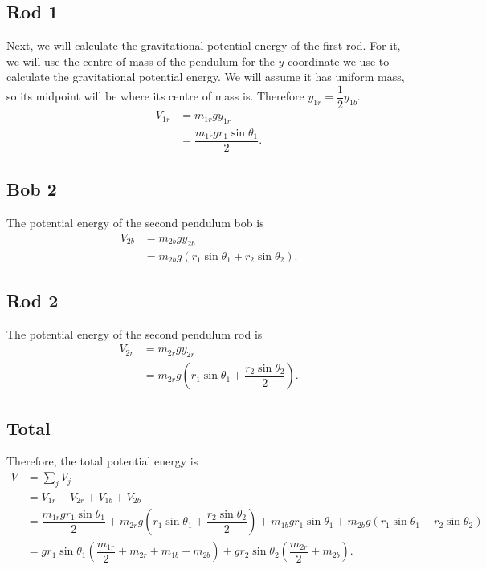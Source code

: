 \documentclass[12pt,a4paper,portrait]{article}
\begin{document}
	\subsection{Rod 1}
	Next, we will calculate the gravitational potential energy of the first rod. For it, we will use the centre of mass of the pendulum for the $y$-coordinate we use to calculate the gravitational potential energy. We will assume it has uniform mass, so its midpoint will be where its centre of mass is. Therefore $y_{1r} = \dfrac{1}{2}y_{1b}$. 
	\begin{align*}
		V_{1r} &= m_{1r} gy_{1r} \\
		&= \dfrac{m_{1r}gr_1 \sin{\theta_1}}{2}.
	\end{align*}
	
	\subsection{Bob 2}
	The potential energy of the second pendulum bob is
	\begin{align*}
		V_{2b} &= m_{2b} gy_{2b} \\
		&= m_{2b} g \left(r_1 \sin{\theta_1} + r_2 \sin{\theta_2}\right).
	\end{align*}
	
	\subsection{Rod 2}
	The potential energy of the second pendulum rod is
	\begin{align*}
		V_{2r} &= m_{2r} gy_{2r} \\
		 &= m_{2r}g \left(r_1 \sin{\theta_1} + \dfrac{r_2\sin{\theta_2}}{2}\right).
	\end{align*}
	
	\subsection{Total}
	Therefore, the total potential energy is
	\begin{align*}
		V &= \sum_j V_j \\
		&= V_{1r} + V_{2r} + V_{1b} + V_{2b} \\
		&= \dfrac{m_{1r}gr_1 \sin{\theta_1}}{2} + m_{2r}g \left(r_1 \sin{\theta_1} + \dfrac{r_2\sin{\theta_2}}{2}\right) + m_{1b}gr_1 \sin{\theta_1} + m_{2b} g \left(r_1 \sin{\theta_1} + r_2 \sin{\theta_2}\right) \\
		&= gr_1 \sin{\theta_1}\left(\dfrac{m_{1r}}{2} + m_{2r} + m_{1b} + m_{2b}\right) + gr_2 \sin{\theta_2}\left(\dfrac{m_{2r}}{2} + m_{2b}\right).
	\end{align*}
	
\end{document}
